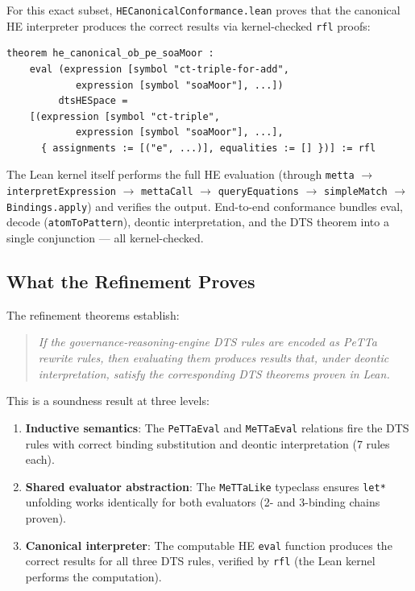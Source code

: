 \documentclass[]{article}
\newcommand{\code}[1]{\texttt{#1}}
\newcommand{\DTS}{\textup{DTS}}
\begin{document}
For this exact subset, \code{HECanonicalConformance.lean} proves that the
canonical HE interpreter produces the correct results via kernel-checked
\code{rfl} proofs:

\begin{lstlisting}
theorem he_canonical_ob_pe_soaMoor :
    eval (expression [symbol "ct-triple-for-add",
            expression [symbol "soaMoor"], ...])
         dtsHESpace =
    [(expression [symbol "ct-triple",
            expression [symbol "soaMoor"], ...],
      { assignments := [("e", ...)], equalities := [] })] := rfl
\end{lstlisting}

\noindent
The Lean kernel itself performs the full HE evaluation (through \code{metta}
$\to$ \code{interpretExpression} $\to$ \code{mettaCall} $\to$
\code{queryEquations} $\to$ \code{simpleMatch} $\to$ \code{Bindings.apply})
and verifies the output.  End-to-end conformance bundles eval, decode
(\code{atomToPattern}), deontic interpretation, and the DTS theorem into
a single conjunction --- all kernel-checked.

\subsection{What the Refinement Proves}

The refinement theorems establish:

\begin{quote}
\emph{If the governance-reasoning-engine DTS rules are encoded as PeTTa rewrite
rules, then evaluating them produces results that, under deontic interpretation,
satisfy the corresponding \DTS{} theorems proven in Lean.}
\end{quote}

\noindent
This is a soundness result at three levels:

\begin{enumerate}
\item \textbf{Inductive semantics}: The \code{PeTTaEval} and
      \code{MeTTaEval} relations fire the DTS rules with correct
      binding substitution and deontic interpretation (7 rules each).
\item \textbf{Shared evaluator abstraction}: The \code{MeTTaLike}
      typeclass ensures \code{let*} unfolding works identically for
      both evaluators (2- and 3-binding chains proven).
\item \textbf{Canonical interpreter}: The computable HE \code{eval}
      function produces the correct results for all three DTS rules,
      verified by \code{rfl} (the Lean kernel performs the computation).
\end{enumerate}
\end{document}
